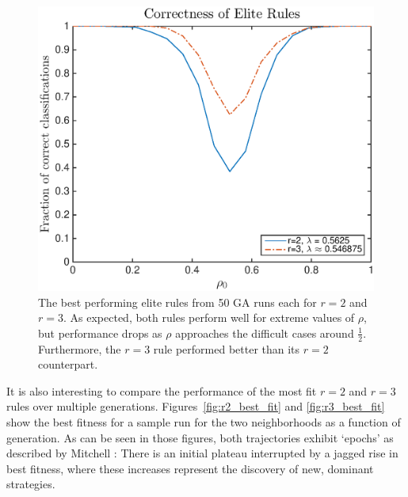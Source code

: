 \begin{figure}
\begin{center}
\includegraphics[width=\linewidth]{figures/lambda_correctness_plot.eps}
\caption{The best performing elite rules from 50 GA runs each for $r = 2$ and $r = 3$. As expected, both rules perform well for extreme values 
of $\rho$, but performance drops as $\rho$ approaches the difficult cases around $\frac{1}{2}$. Furthermore, the $r = 3$ rule performed better than 
its $r = 2$ counterpart.}
\label{fig:r2_r3_rho}
\end{center}
\end{figure}

It is also interesting to compare the performance of the most fit $r = 2$ and $r = 3$ rules over multiple generations. Figures~\ref{fig:r2_best_fit} and 
\ref{fig:r3_best_fit} show the best fitness for a sample run for the two neighborhoods as a function of generation. As can be seen in those figures, both trajectories exhibit `epochs' as described by Mitchell \cite{Mitchell:1994:ECA:186092.186116}: There is an initial plateau interrupted by a jagged rise in 
best fitness, where these increases represent the discovery of new, dominant strategies.

